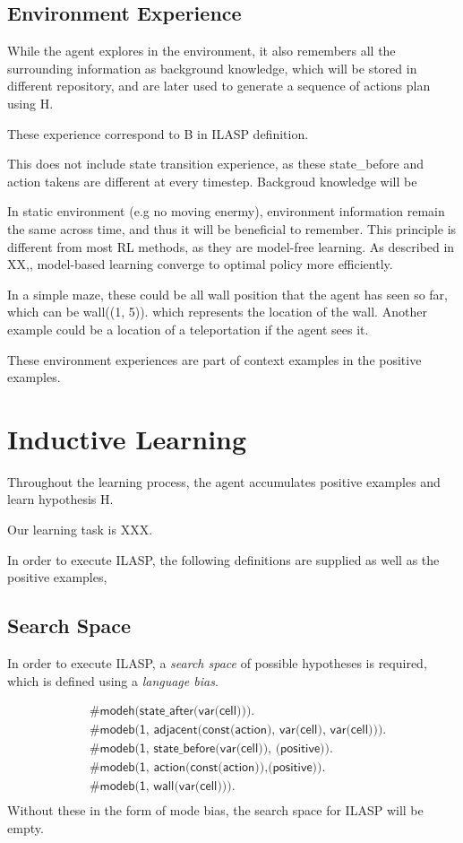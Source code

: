 \subsection{Environment Experience}

While the agent explores in the environment, it also remembers all the surrounding information as background knowledge, 
which will be stored in different repository, and are later used to generate a sequence of actions plan using H.

These experience correspond to B in ILASP definition. 

This does not include state transition experience, as these state\_before and action takens are different at every timestep.
Backgroud knowledge will be 

In static environment (e.g no moving enermy), environment information remain the same across time, and thus it will be beneficial to remember. 
This principle is different from most RL methods, as they are model-free learning. 
As described in XX,, model-based learning converge to optimal policy more efficiently. 

In a simple maze, these could be all wall position that the agent has seen so far, which can be 
wall((1, 5)). which represents the location of the wall. 
Another example could be a location of a teleportation if the agent sees it. 

These environment experiences are part of context examples in the positive examples. 

\section{Inductive Learning}
\label{induction}
Throughout the learning process, the agent accumulates positive examples and learn hypothesis H. 

Our learning task is XXX.

In order to execute ILASP, the following definitions are supplied as well as the positive examples,

\subsection{Search Space}
In order to execute ILASP, a \textit{search space} of possible hypotheses is required, which is defined using a \textit{language bias}. 

\begin{equation}
\begin{split}    
&\textsf{\#modeh(state\_after(var(cell))).}\\
&\textsf{\#modeb(1, adjacent(const(action), var(cell), var(cell))).} \\
&\textsf{\#modeb(1, state\_before(var(cell)), (positive)).} \\
&\textsf{\#modeb(1, action(const(action)),(positive)).} \\
&\textsf{\#modeb(1, wall(var(cell))).} \\
\end{split}
\end{equation}
Without these in the form of mode bias, the search space for ILASP will be empty. 

